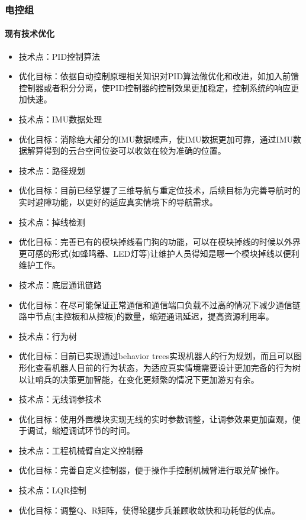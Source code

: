 \subsubsection{电控组}

    \paragraph{现有技术优化}
    
    
        \begin{itemize}
            \item 技术点：PID控制算法
            \item 优化目标：依据自动控制原理相关知识对PID算法做优化和改进，如加入前馈控制器或者积分分离，使PID控制器的控制效果更加稳定，控制系统的响应更加快速。
            \item 技术点：IMU数据处理
            \item 优化目标：消除绝大部分的IMU数据噪声，使IMU数据更加可靠，通过IMU数据解算得到的云台空间位姿可以收敛在较为准确的位置。
            \item 技术点：路径规划
            \item 优化目标：目前已经掌握了三维导航与重定位技术，后续目标为完善导航时的实时避障功能，以更好的适应真实情境下的导航需求。
            \item 技术点：掉线检测
            \item 优化目标：完善已有的模块掉线看门狗的功能，可以在模块掉线的时候以外界更可感的形式(如蜂鸣器、LED灯等)让维护人员得知是哪一个模块掉线以便利维护工作。
            \item 技术点：底层通讯链路
            \item 优化目标：在尽可能保证正常通信和通信端口负载不过高的情况下减少通信链路中节点(主控板和从控板)的数量，缩短通讯延迟，提高资源利用率。
            \item 技术点：行为树
            \item 优化目标：目前已实现通过behavior trees实现机器人的行为规划，而且可以图形化查看机器人目前的行为状态，为适应真实情境需要设计更加完备的行为树以让哨兵的决策更加智能，在变化更频繁的情况下更加游刃有余。
            \item 技术点：无线调参技术
            \item 优化目标：使用外置模块实现无线的实时参数调整，让调参效果更加直观，便于调试，缩短调试环节的时间。
            \item 技术点：工程机械臂自定义控制器
            \item 优化目标：完善自定义控制器，便于操作手控制机械臂进行取兑矿操作。
            \item 技术点：LQR控制
            \item 优化目标：调整Q、R矩阵，使得轮腿步兵兼顾收敛快和功耗低的优点。
        \end{itemize}

